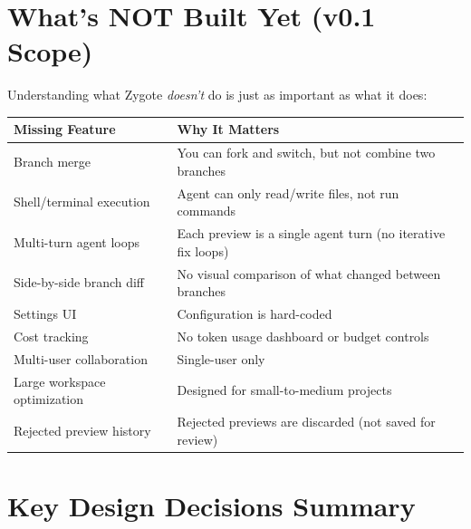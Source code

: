 \documentclass[12pt, a4paper]{article}
\begin{document}
\newpage

\section{What's NOT Built Yet (v0.1 Scope)}

Understanding what Zygote \textit{doesn't} do is just as important as what it does:

\begin{table}[H]
\centering
\begin{tabular}{@{}p{4.5cm}p{9cm}@{}}
\toprule
\textbf{Missing Feature} & \textbf{Why It Matters} \\
\midrule
Branch merge & You can fork and switch, but not combine two branches \\
Shell/terminal execution & Agent can only read/write files, not run commands \\
Multi-turn agent loops & Each preview is a single agent turn (no iterative fix loops) \\
Side-by-side branch diff & No visual comparison of what changed between branches \\
Settings UI & Configuration is hard-coded \\
Cost tracking & No token usage dashboard or budget controls \\
Multi-user collaboration & Single-user only \\
Large workspace optimization & Designed for small-to-medium projects \\
Rejected preview history & Rejected previews are discarded (not saved for review) \\
\bottomrule
\end{tabular}
\end{table}

\newpage

\section{Key Design Decisions Summary}
\end{document}
